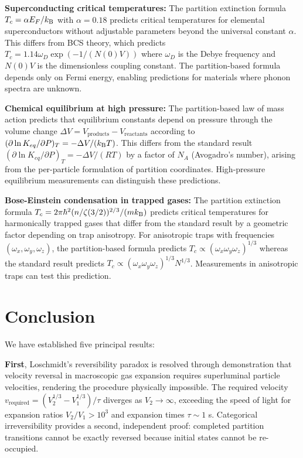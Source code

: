 \textbf{Superconducting critical temperatures:} The partition extinction formula $T_c = \alpha E_F/k_{\mathrm{B}}$ with $\alpha = 0.18$ predicts critical temperatures for elemental superconductors without adjustable parameters beyond the universal constant $\alpha$. This differs from BCS theory, which predicts $T_c = 1.14 \omega_D \exp(-1/(N(0)V))$ where $\omega_D$ is the Debye frequency and $N(0)V$ is the dimensionless coupling constant. The partition-based formula depends only on Fermi energy, enabling predictions for materials where phonon spectra are unknown.

\textbf{Chemical equilibrium at high pressure:} The partition-based law of mass action predicts that equilibrium constants depend on pressure through the volume change $\Delta V = V_{\text{products}} - V_{\text{reactants}}$ according to $(\partial \ln K_{eq}/\partial P)_T = -\Delta V/(k_{\mathrm{B}} T)$. This differs from the standard result $(\partial \ln K_{eq}/\partial P)_T = -\Delta V/(RT)$ by a factor of $N_A$ (Avogadro's number), arising from the per-particle formulation of partition coordinates. High-pressure equilibrium measurements can distinguish these predictions.

\textbf{Bose-Einstein condensation in trapped gases:} The partition extinction formula $T_c = 2\pi\hbar^2(n/\zeta(3/2))^{2/3}/(mk_{\mathrm{B}})$ predicts critical temperatures for harmonically trapped gases that differ from the standard result by a geometric factor depending on trap anisotropy. For anisotropic traps with frequencies $(\omega_x, \omega_y, \omega_z)$, the partition-based formula predicts $T_c \propto (\omega_x \omega_y \omega_z)^{1/3}$ whereas the standard result predicts $T_c \propto (\omega_x \omega_y \omega_z)^{1/3} N^{1/3}$. Measurements in anisotropic traps can test this prediction.

\section{Conclusion}
\label{sec:conclusion}

We have established five principal results:

\textbf{First}, Loschmidt's reversibility paradox is resolved through demonstration that velocity reversal in macroscopic gas expansion requires superluminal particle velocities, rendering the procedure physically impossible. The required velocity $v_{\text{required}} = (V_2^{1/3} - V_1^{1/3})/\tau$ diverges as $V_2 \to \infty$, exceeding the speed of light for expansion ratios $V_2/V_1 > 10^3$ and expansion times $\tau \sim 1$ s. Categorical irreversibility provides a second, independent proof: completed partition transitions cannot be exactly reversed because initial states cannot be re-occupied.

